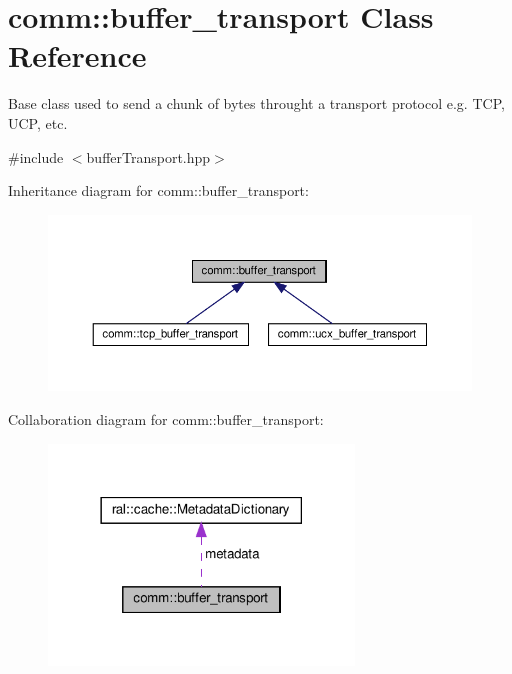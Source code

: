 \hypertarget{classcomm_1_1buffer__transport}{}\section{comm\+:\+:buffer\+\_\+transport Class Reference}
\label{classcomm_1_1buffer__transport}


Base class used to send a chunk of bytes throught a transport protocol e.\+g. T\+CP, U\+CP, etc.  




{\ttfamily \#include $<$buffer\+Transport.\+hpp$>$}



Inheritance diagram for comm\+:\+:buffer\+\_\+transport\+:\nopagebreak
\begin{figure}[H]
\begin{center}
\leavevmode
\includegraphics[width=350pt]{classcomm_1_1buffer__transport__inherit__graph}
\end{center}
\end{figure}


Collaboration diagram for comm\+:\+:buffer\+\_\+transport\+:\nopagebreak
\begin{figure}[H]
\begin{center}
\leavevmode
\includegraphics[width=230pt]{classcomm_1_1buffer__transport__coll__graph}
\end{center}
\end{figure}
